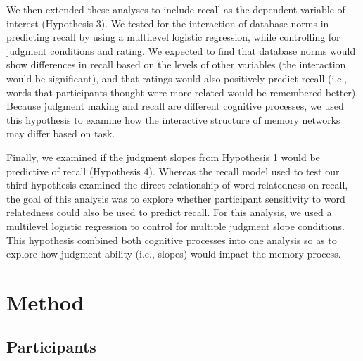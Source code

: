 \documentclass[english,,man]{apa6}
\begin{document}
We then extended these analyses to include recall as the dependent variable of interest (Hypothesis 3). We tested for the interaction of database norms in predicting recall by using a multilevel logistic regression, while controlling for judgment conditions and rating. We expected to find that database norms would show differences in recall based on the levels of other variables (the interaction would be significant), and that ratings would also positively predict recall (i.e., words that participants thought were more related would be remembered better). Because judgment making and recall are different cognitive processes, we used this hypothesis to examine how the interactive structure of memory networks may differ based on task.

Finally, we examined if the judgment slopes from Hypothesis 1 would be predictive of recall (Hypothesis 4). Whereas the recall model used to test our third hypothesis examined the direct relationship of word relatedness on recall, the goal of this analysis was to explore whether participant sensitivity to word relatedness could also be used to predict recall. For this analysis, we used a multilevel logistic regression to control for multiple judgment slope conditions. This hypothesis combined both cognitive processes into one analysis so as to explore how judgment ability (i.e., slopes) would impact the memory process.

\hypertarget{method}{%
\section{Method}\label{method}}

\hypertarget{participants}{%
\subsection{Participants}\label{participants}}
\end{document}
